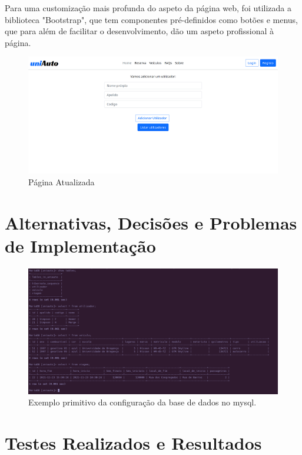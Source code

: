 \documentclass[11pt,a4paper]{report}%
\begin{document}
Para uma customização mais profunda do aspeto da página web, foi utilizada a biblioteca "Bootstrap", que tem componentes pré-definidos como botões e menus, que para além de facilitar o desenvolvimento, dão um aspeto profissional à página. 
\begin{figure}[h!]
\centering
\includegraphics[scale=1.0]{Pictures/Menu3.png}
\caption{\label{fig:Diagrama} Página Atualizada}
\end{figure}
\newpage

\section{Alternativas, Decisões e Problemas de Implementação}

\begin{figure}[h!]
\includegraphics[scale=0.5]{Pictures/db.png}
\caption{\label{fig:Mysql} Exemplo primitivo da configuração da base de dados no mysql.}
\end{figure}
\newpage




\section{Testes Realizados e Resultados}
\lstset{style=mystyle}
\end{document}
